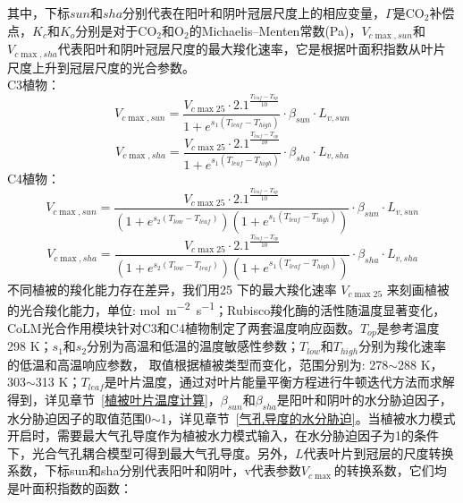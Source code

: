 其中，下标$sun$和$sha$分别代表在阳叶和阴叶冠层尺度上的相应变量，$\Gamma$是CO$_2$补偿点，$K_c$和$K_o$分别是对于CO$_2$和O$_2$的Michaelis--Menten常数(Pa)，$V_{c \max,sun}$和$V_{c \max,sha}$代表阳叶和阴叶冠层尺度的最大羧化速率，它是根据叶面积指数从叶片尺度上升到冠层尺度的光合参数。\\
C3植物：\\
\begin{equation}\label{V_cmaxsun_a}
V_{c \max,sun }=\frac{V_{c \max 25} \cdot 2.1^{\frac{T_{{leaf }}-T_{o p}}{10}}}{1+e^{s_{1}\left(T_{{leaf }}-T_{{high }}\right)}} \cdot \beta_{sun} \cdot L_{v,sun}
\end{equation}
\begin{equation}\label{V_cmaxsha_a}
V_{c \max,sha }=\frac{V_{c \max 25} \cdot 2.1^{\frac{T_{{leaf }}-T_{o p}}{10}}}{1+e^{s_{1}\left(T_{{leaf }}-T_{{high }}\right)}} \cdot \beta_{sha} \cdot L_{v,sha}
\end{equation}
C4植物：\\
\begin{equation}\label{V_cmaxsun_b}
V_{c \max,sun }= \frac{V_{c \max 25} \cdot 2.1^{\frac{T_{{leaf }}-T_{o p}}{10}}}{\left(1+e^{s_{2}\left(T_{{low }}
 - T_{{leaf }}\right)}\right)\left(1+e^{s_{1}\left(T_{{leaf }}-T_{h i g h}\right)}\right)} \cdot \beta_{sun} \cdot L_{v,sun}
\end{equation}
\begin{equation}\label{V_cmaxsha_b}
V_{c \max,sha }= \frac{V_{c \max 25} \cdot 2.1^{\frac{T_{{leaf }}-T_{o p}}{10}}}{\left(1+e^{s_{2}\left(T_{{low }}
 - T_{{leaf }}\right)}\right)\left(1+e^{s_{1}\left(T_{{leaf }}-T_{h i g h}\right)}\right)} \cdot \beta_{sha} \cdot L_{v,sha}
\end{equation}
不同植被的羧化能力存在差异，我们用25 \textcelsius 下的最大羧化速率 $V_{c \max 25}$ 来刻画植被的光合羧化能力，单位: \unit{mol.m^{-2}.s^{-1}}；Rubisco羧化酶的活性随温度显著变化，CoLM光合作用模块针对C3和C4植物制定了两套温度响应函数。$T_{op}$是参考温度298 K；$s_1$和$s_2$分别为高温和低温的温度敏感性参数；$T_{low}$和$T_{high}$分别为羧化速率的低温和高温响应参数，
取值根据植被类型而变化，范围分别为: 278$\sim$288 K，303$\sim$313 K；$T_{leaf}$是叶片温度，通过对叶片能量平衡方程进行牛顿迭代方法而求解得到，详见章节~\ref{植被叶片温度计算}，$\beta_{sun}$和$\beta_{sha}$是阳叶和阴叶的水分胁迫因子，水分胁迫因子的取值范围0$\sim$1，详见章节~\ref{气孔导度的水分胁迫}。当植被水力模式开启时，需要最大气孔导度作为植被水力模式输入，在水分胁迫因子为1的条件下，光合气孔耦合模型可得到最大气孔导度。另外，$L$代表叶片到冠层的尺度转换系数，下标sun和sha分别代表阳叶和阴叶，v代表参数$V_{c \max}$的转换系数，它们均是叶面积指数的函数：

